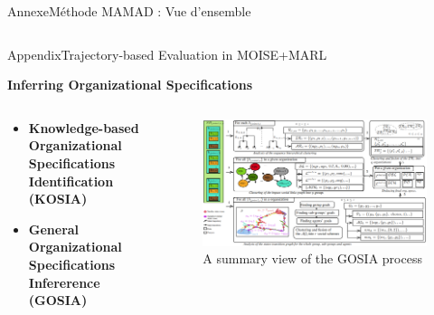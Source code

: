 \begin{frame}{Annexe}{Méthode MAMAD : Vue d’ensemble}
\begin{columns}
    \end{columns}

\end{frame}


\begin{frame}{Appendix}{Trajectory-based Evaluation in MOISE+MARL}

    \textbf{Inferring Organizational Specifications}

    \begin{columns}

        \begin{column}{0.3\textwidth}

            \begin{itemize}
                \item \textbf{Knowledge-based Organizational Specifications Identification (KOSIA)}
                \item \textbf{General Organizational Specifications Infererence (GOSIA)}
            \end{itemize}

        \end{column}

        \begin{column}{0.8\textwidth}
            \begin{figure}
                \centering
                \includegraphics[width=0.95\linewidth]{figures/GOSIA_view.png}
                \caption*{A summary view of the GOSIA process}
                \label{fig:gosia_process}
            \end{figure}
        \end{column}

    \end{columns}

\end{frame}
